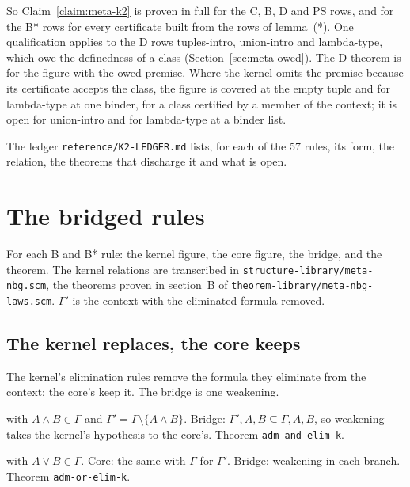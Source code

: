 So Claim~\ref{claim:meta-k2} is proven in full for the C, B, D and PS
rows, and for the B* rows for every certificate built from the rows of
lemma~(*).  One qualification applies to the D rows tuples-intro,
union-intro and lambda-type, which owe the definedness of a class
(Section~\ref{sec:meta-owed}).  The D theorem is for the figure with
the owed premise.  Where the kernel omits the premise because its
certificate accepts the class, the figure is covered at the empty tuple
and for lambda-type at one binder, for a class certified by a member of
the context; it is open for union-intro and for lambda-type at a binder
list.

The ledger \texttt{reference/K2-LEDGER.md} lists, for each of the 57
rules, its form, the relation, the theorems that discharge it and what
is open.

\section{The bridged rules}\label{sec:meta-bridges}

For each B and B* rule: the kernel figure, the core figure, the bridge,
and the theorem.  The kernel relations are transcribed in
\texttt{structure-library/meta-nbg.scm}, the theorems proven in section~B
of \texttt{theorem-library/meta-nbg-laws.scm}.  $\Gamma'$ is the context
with the eliminated formula removed.

\subsection{The kernel replaces, the core keeps}

The kernel's elimination rules remove the formula they eliminate from
the context; the core's keep it.  The bridge is one weakening.

with $A \wedge B \in \Gamma$ and $\Gamma' = \Gamma \setminus \{A\wedge B\}$.
Bridge: $\Gamma', A, B \subseteq \Gamma, A, B$, so weakening takes the
kernel's hypothesis to the core's.  Theorem \texttt{adm-and-elim-k}.

with $A \vee B \in \Gamma$.  Core: the same with $\Gamma$ for $\Gamma'$.
Bridge: weakening in each branch.  Theorem \texttt{adm-or-elim-k}.

